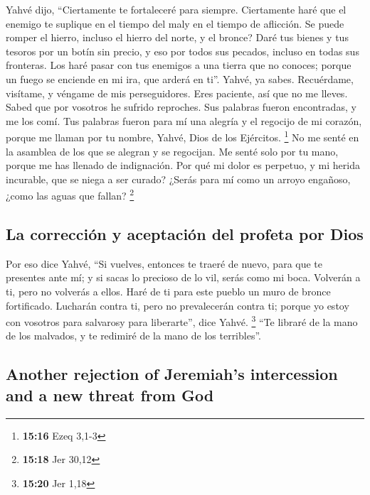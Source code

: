 \begin{paracol}{2}
 Yahvé dijo, ``Ciertamente te fortaleceré para siempre.
Ciertamente haré que el enemigo te suplique en el tiempo del maly en el
tiempo de aflicción.  Se puede romper el hierro, incluso
el hierro del norte, y el bronce?  Daré tus bienes y tus
tesoros por un botín sin precio, y eso por todos sus pecados, incluso en
todas sus fronteras.  Los haré pasar con tus enemigos a
una tierra que no conoces; porque un fuego se enciende en mi ira, que
arderá en ti''.  Yahvé, ya sabes. Recuérdame, visítame, y
véngame de mis perseguidores. Eres paciente, así que no me lleves. Sabed
que por vosotros he sufrido reproches.  Sus palabras
fueron encontradas, y me los comí. Tus palabras fueron para mí una
alegría y el regocijo de mi corazón, porque me llaman por tu nombre,
Yahvé, Dios de los Ejércitos. \footnote{\textbf{15:16} Ezeq 3,1-3}
 No me senté en la asamblea de los que se alegran y se
regocijan. Me senté solo por tu mano, porque me has llenado de
indignación.  Por qué mi dolor es perpetuo, y mi herida
incurable, que se niega a ser curado? ¿Serás para mí como un arroyo
engañoso, ¿como las aguas que fallan? \footnote{\textbf{15:18} Jer 30,12}

\hypertarget{la-correcciuxf3n-y-aceptaciuxf3n-del-profeta-por-dios}{%
\subsection{La corrección y aceptación del profeta por
Dios}\label{la-correcciuxf3n-y-aceptaciuxf3n-del-profeta-por-dios}}

 Por eso dice Yahvé, ``Si vuelves, entonces te traeré de
nuevo, para que te presentes ante mí; y si sacas lo precioso de lo vil,
serás como mi boca. Volverán a ti, pero no volverás a ellos.
 Haré de ti para este pueblo un muro de bronce
fortificado. Lucharán contra ti, pero no prevalecerán contra ti; porque
yo estoy con vosotros para salvarosy para liberarte'', dice Yahvé.
\footnote{\textbf{15:20} Jer 1,18}  ``Te libraré de la
mano de los malvados, y te redimiré de la mano de los terribles''.

\switchcolumn
\begin{otherlanguage}{english}

\hypertarget{another-rejection-of-jeremiahs-intercession-and-a-new-threat-from-god}{%
\subsection{Another rejection of Jeremiah's intercession and a new
threat from
God}\label{another-rejection-of-jeremiahs-intercession-and-a-new-threat-from-god}}


\end{otherlanguage}
\end{paracol}
